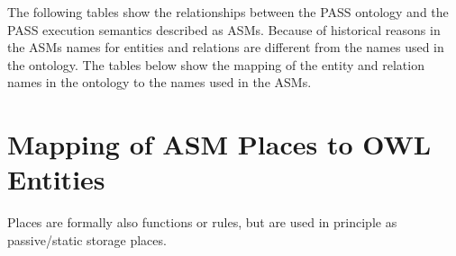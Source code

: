The following tables show the relationships between the PASS ontology and the PASS execution semantics described as ASMs.
Because of historical reasons in the ASMs names for entities and relations are different from the names used in the ontology.
The tables below show the mapping of the entity and relation names in the ontology to the names used in the ASMs.

\section{Mapping of ASM Places to OWL Entities}
Places are formally also functions or rules, but are used in principle as passive/static storage places.

\footnotesize




